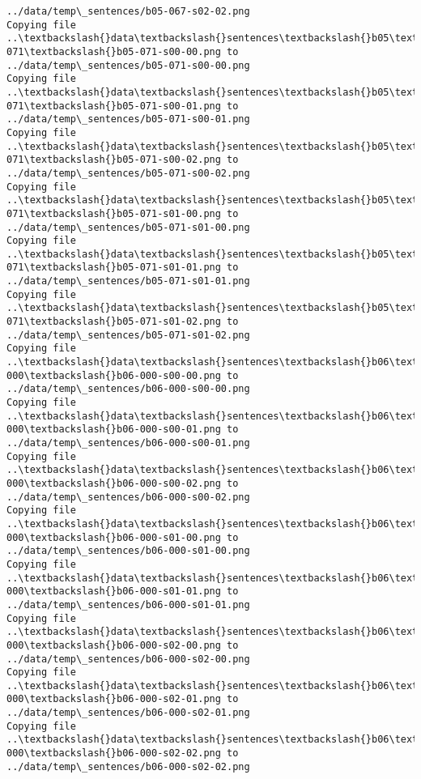 \documentclass[11pt]{article}
\begin{document}
\begin{Verbatim}[commandchars=\\\{\}]
../data/temp\_sentences/b05-067-s02-02.png
Copying file ..\textbackslash{}data\textbackslash{}sentences\textbackslash{}b05\textbackslash{}b05-071\textbackslash{}b05-071-s00-00.png to
../data/temp\_sentences/b05-071-s00-00.png
Copying file ..\textbackslash{}data\textbackslash{}sentences\textbackslash{}b05\textbackslash{}b05-071\textbackslash{}b05-071-s00-01.png to
../data/temp\_sentences/b05-071-s00-01.png
Copying file ..\textbackslash{}data\textbackslash{}sentences\textbackslash{}b05\textbackslash{}b05-071\textbackslash{}b05-071-s00-02.png to
../data/temp\_sentences/b05-071-s00-02.png
Copying file ..\textbackslash{}data\textbackslash{}sentences\textbackslash{}b05\textbackslash{}b05-071\textbackslash{}b05-071-s01-00.png to
../data/temp\_sentences/b05-071-s01-00.png
Copying file ..\textbackslash{}data\textbackslash{}sentences\textbackslash{}b05\textbackslash{}b05-071\textbackslash{}b05-071-s01-01.png to
../data/temp\_sentences/b05-071-s01-01.png
Copying file ..\textbackslash{}data\textbackslash{}sentences\textbackslash{}b05\textbackslash{}b05-071\textbackslash{}b05-071-s01-02.png to
../data/temp\_sentences/b05-071-s01-02.png
Copying file ..\textbackslash{}data\textbackslash{}sentences\textbackslash{}b06\textbackslash{}b06-000\textbackslash{}b06-000-s00-00.png to
../data/temp\_sentences/b06-000-s00-00.png
Copying file ..\textbackslash{}data\textbackslash{}sentences\textbackslash{}b06\textbackslash{}b06-000\textbackslash{}b06-000-s00-01.png to
../data/temp\_sentences/b06-000-s00-01.png
Copying file ..\textbackslash{}data\textbackslash{}sentences\textbackslash{}b06\textbackslash{}b06-000\textbackslash{}b06-000-s00-02.png to
../data/temp\_sentences/b06-000-s00-02.png
Copying file ..\textbackslash{}data\textbackslash{}sentences\textbackslash{}b06\textbackslash{}b06-000\textbackslash{}b06-000-s01-00.png to
../data/temp\_sentences/b06-000-s01-00.png
Copying file ..\textbackslash{}data\textbackslash{}sentences\textbackslash{}b06\textbackslash{}b06-000\textbackslash{}b06-000-s01-01.png to
../data/temp\_sentences/b06-000-s01-01.png
Copying file ..\textbackslash{}data\textbackslash{}sentences\textbackslash{}b06\textbackslash{}b06-000\textbackslash{}b06-000-s02-00.png to
../data/temp\_sentences/b06-000-s02-00.png
Copying file ..\textbackslash{}data\textbackslash{}sentences\textbackslash{}b06\textbackslash{}b06-000\textbackslash{}b06-000-s02-01.png to
../data/temp\_sentences/b06-000-s02-01.png
Copying file ..\textbackslash{}data\textbackslash{}sentences\textbackslash{}b06\textbackslash{}b06-000\textbackslash{}b06-000-s02-02.png to
../data/temp\_sentences/b06-000-s02-02.png

\end{Verbatim}
\end{document}
